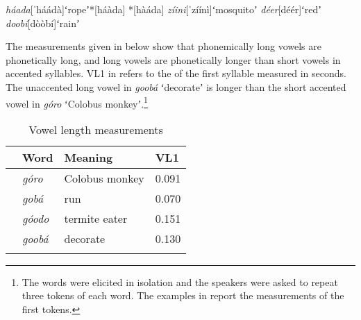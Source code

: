 \documentclass[output=paper,modfonts,nonflat,hidelinks]{langsci/langscibook}
\begin{document}
\begin{exe}
	\ex \begin{xlist}
	\ex \textit{háada}\hspace{7mm}[ˈháádà]\hspace{4mm}ʻropeʼ\hspace{10mm}*[háàda] *[hàáda]
    \ex \textit{zíini}\hspace{10mm}[ˈzíínì]\hspace{6mm}ʻmosquitoʼ\hspace{3mm}
    \ex \textit{déer}\hspace{11mm}[déér]\hspace{7mm}ʻredʼ\hspace{12mm}
	\ex \textit{doobí}\hspace{9mm}[dòòbí]\hspace{5mm}ʻrainʼ\hspace{12mm}
    \end{xlist} \label{ex:Petrollino:nocontour}
\end{exe}

\largerpage
The measurements given in  below show that phonemically long vowels are phonetically long, and long vowels are phonetically longer than short vowels in accented syllables. VL1 in  refers to the  of the first syllable measured in seconds. The unaccented long vowel in \textit{goobá} ʻdecorateʼ is longer than the short accented vowel in \textit{góro} ʻColobus monkeyʼ.\footnote{The words were  elicited in isolation and the speakers were asked to repeat three tokens of each word. The examples in  report the measurements of the first tokens.}



\clearpage 
\begin{table}
\caption{Vowel length measurements}
\label{tab:Petrollino:3}
 \begin{tabular}{llll}
  \lsptoprule
    & Word & Meaning & VL1\\
  \midrule
    &   \textit{góro} & Colobus monkey &  0.091\\
    &   \textit{gobá} & run & 0.070 \\
    &   \textit{góodo} & termite eater & 0.151\\
    &	\textit{goobá} & decorate & 0.130\\
  \lspbottomrule
 \end{tabular}
\end{table}
\end{document}
